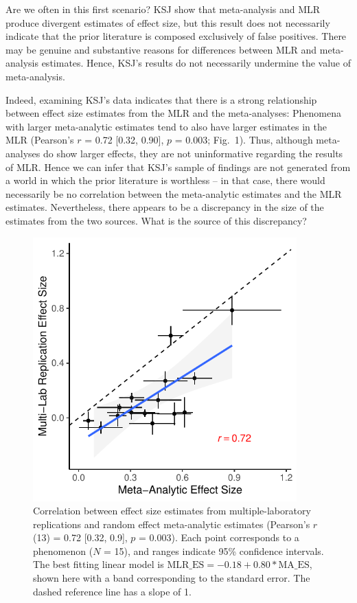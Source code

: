 \documentclass[man,floatsintext]{apa7}
\begin{document}
Are we often in this first scenario? KSJ show that meta-analysis and MLR produce divergent estimates of effect size, but this result does not necessarily indicate that the prior literature is composed exclusively of false positives. There may be genuine and substantive reasons for differences between MLR and meta-analysis estimates. Hence, KSJ's results do not necessarily undermine the value of meta-analysis.

Indeed, examining KSJ’s data indicates that there is a strong relationship between effect size estimates from the MLR and the meta-analyses: Phenomena with larger meta-analytic estimates tend to also have larger estimates in the MLR (Pearson’s $r$ = 0.72 [0.32, 0.90], $p$ = 0.003; Fig.\ 1). Thus, although meta-analyses do show larger effects, they are not uninformative regarding the results of MLR. Hence we can infer that KSJ’s sample of findings are not generated from a world in which the prior literature is worthless -- in that case, there would necessarily be no correlation between the meta-analytic estimates and the MLR estimates. Nevertheless, there appears to be a discrepancy in the size of the estimates from the two sources.  What is the source of this discrepancy? 

\begin{figure}[ht]
\centering
     \includegraphics[width=4in]{fig1.pdf}
      \caption{Correlation between effect size estimates from multiple-laboratory replications and random effect meta-analytic estimates (Pearson’s $r$(13) = 0.72 [0.32, 0.9], $p$ = 0.003). Each point corresponds to a phenomenon ($N$ = 15), and ranges indicate 95\% confidence intervals. The best fitting linear model is $\text{MLR\_ES}= -0.18  +  0.80 *\text{MA\_ ES}$, shown here with a band corresponding to the standard error. The dashed reference line has a slope of 1. }
\end{figure}
\end{document}
